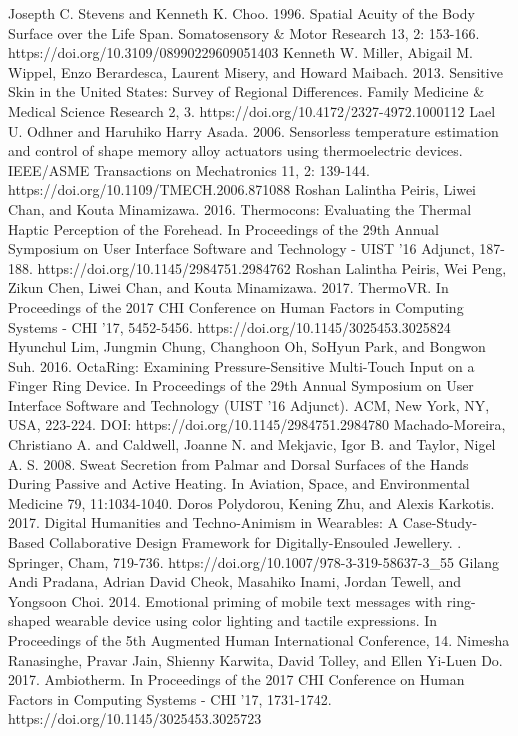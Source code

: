 \documentclass[preprint,12pt]{elsarticle}
\begin{document}
\begin{thebibliography}{00}
Josepth C. Stevens and Kenneth K. Choo. 1996. Spatial Acuity of the Body Surface over the Life Span. Somatosensory \& Motor Research 13, 2: 153-166. https://doi.org/10.3109/08990229609051403
Kenneth W. Miller, Abigail M. Wippel, Enzo Berardesca, Laurent Misery, and Howard Maibach. 2013. Sensitive Skin in the United States: Survey of Regional Differences. Family Medicine \& Medical Science Research 2, 3. https://doi.org/10.4172/2327-4972.1000112
Lael U. Odhner and Haruhiko Harry Asada. 2006. Sensorless temperature estimation and control of shape memory alloy actuators using thermoelectric devices. IEEE/ASME Transactions on Mechatronics 11, 2: 139-144. https://doi.org/10.1109/TMECH.2006.871088
Roshan Lalintha Peiris, Liwei Chan, and Kouta Minamizawa. 2016. Thermocons: Evaluating the Thermal Haptic Perception of the Forehead. In Proceedings of the 29th Annual Symposium on User Interface Software and Technology - UIST '16 Adjunct, 187-188. https://doi.org/10.1145/2984751.2984762
Roshan Lalintha Peiris, Wei Peng, Zikun Chen, Liwei Chan, and Kouta Minamizawa. 2017. ThermoVR. In Proceedings of the 2017 CHI Conference on Human Factors in Computing Systems - CHI '17, 5452-5456. https://doi.org/10.1145/3025453.3025824
Hyunchul Lim, Jungmin Chung, Changhoon Oh, SoHyun Park, and Bongwon Suh. 2016. OctaRing: Examining Pressure-Sensitive Multi-Touch Input on a Finger Ring Device. In Proceedings of the 29th Annual Symposium on User Interface Software and Technology (UIST '16 Adjunct). ACM, New York, NY, USA, 223-224. DOI: https://doi.org/10.1145/2984751.2984780
Machado-Moreira, Christiano A. and Caldwell, Joanne N. and Mekjavic, Igor B. and Taylor, Nigel A. S. 2008. Sweat Secretion from Palmar and Dorsal Surfaces of the Hands During Passive and Active Heating. In Aviation, Space, and Environmental Medicine 79, 11:1034-1040.
Doros Polydorou, Kening Zhu, and Alexis Karkotis. 2017. Digital Humanities and Techno-Animism in Wearables: A Case-Study-Based Collaborative Design Framework for Digitally-Ensouled Jewellery. . Springer, Cham, 719-736. https://doi.org/10.1007/978-3-319-58637-3\_55
Gilang Andi Pradana, Adrian David Cheok, Masahiko Inami, Jordan Tewell, and Yongsoon Choi. 2014. Emotional priming of mobile text messages with ring-shaped wearable device using color lighting and tactile expressions. In Proceedings of the 5th Augmented Human International Conference, 14.
Nimesha Ranasinghe, Pravar Jain, Shienny Karwita, David Tolley, and Ellen Yi-Luen Do. 2017. Ambiotherm. In Proceedings of the 2017 CHI Conference on Human Factors in Computing Systems - CHI '17, 1731-1742. https://doi.org/10.1145/3025453.3025723

\end{thebibliography}
\end{document}
